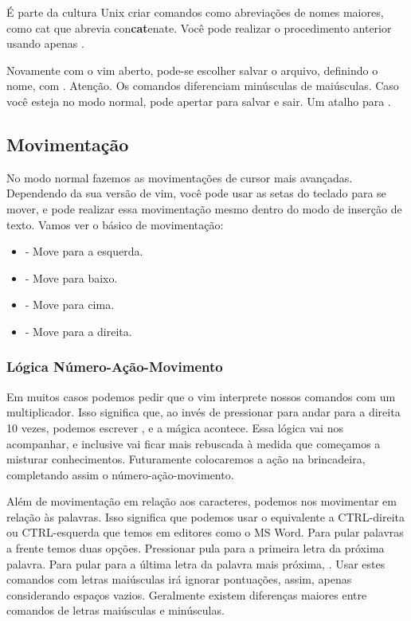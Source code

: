 \documentclass[a4paper, 12pt]{article}
\begin{document}
É parte da cultura Unix criar comandos como abreviações de nomes maiores,
como cat que abrevia con\textbf{cat}enate.
Você pode realizar o procedimento anterior usando apenas .

Novamente com o vim aberto, pode-se escolher salvar o arquivo, definindo o nome, com .
Atenção. Os comandos diferenciam minúsculas de maiúsculas.
Caso você esteja no modo normal, pode apertar  para salvar e sair. Um atalho para .

\subsection{Movimentação}
No modo normal fazemos as movimentações de cursor mais avançadas.
Dependendo da sua versão de vim, você pode usar as setas do teclado para se mover, e pode realizar essa movimentação mesmo dentro do modo de inserção de texto.
Vamos ver o básico de movimentação:
\begin{itemize}
    \item {} - Move para a esquerda.
    \item {} - Move para baixo.
    \item {} - Move para cima.
    \item {} - Move para a direita.
\end{itemize}
\subsubsection{Lógica Número-Ação-Movimento}
Em muitos casos podemos pedir que o vim interprete nossos comandos com um multiplicador.
Isso significa que, ao invés de pressionar  para andar para a direita 10 vezes,
podemos escrever , e a mágica acontece.
Essa lógica vai nos acompanhar, e inclusive vai ficar mais rebuscada à medida que começamos a misturar conhecimentos.
Futuramente colocaremos a ação na brincadeira, completando assim o número-ação-movimento.


Além de movimentação em relação aos caracteres, podemos nos movimentar em relação às palavras.
Isso significa que podemos usar o equivalente a CTRL-direita ou CTRL-esquerda que temos em editores como o MS Word.
Para pular palavras a frente temos duas opções.
Pressionar  pula para a primeira letra da próxima palavra.
Para pular para a última letra da palavra mais próxima, .
Usar estes comandos com letras maiúsculas irá ignorar pontuações, assim, apenas considerando espaços vazios.
Geralmente existem diferenças maiores entre comandos de letras maiúsculas e minúsculas.
\end{document}
